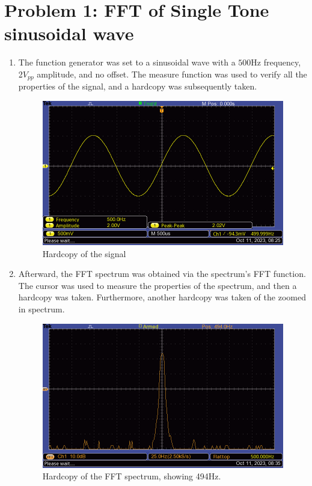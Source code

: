 \section{Problem 1: FFT of Single Tone sinusoidal wave}

\begin{enumerate}
    \item The function generator was set to a sinusoidal wave with a $500$Hz frequency, 2$V_{pp}$ amplitude, and no offset. The measure function was used to verify all the properties of the signal, and a hardcopy was subsequently taken.
          \begin{figure}[H]
              \centering
              \includegraphics[width=0.8\linewidth]{images/problem1_hardcopy1.png}
              \caption{Hardcopy of the signal}
              \label{fig:problem1_hardcopy1}
          \end{figure}
    \item Afterward, the FFT spectrum was obtained via the spectrum's FFT function. The cursor was used to measure the properties of the spectrum, and then a hardcopy was taken. Furthermore, another hardcopy was taken of the zoomed in spectrum.
          \begin{figure}
              \centering
              \includegraphics[width=0.5\linewidth]{images/problem1_hardcopy2.png}
              \caption{Hardcopy of the FFT spectrum, showing 494Hz.}
              \label{fig:problem1_hardcopy2}
          \end{figure}

\end{enumerate}
